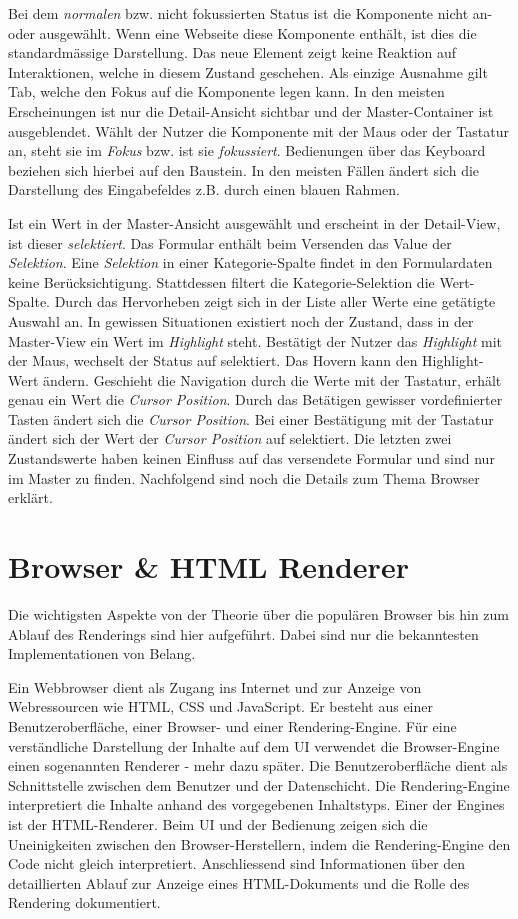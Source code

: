 Bei dem \emph{normalen} bzw. nicht fokussierten Status ist die Komponente nicht an- oder ausgewählt.
Wenn eine Webseite diese Komponente enthält, ist dies die standardmässige Darstellung.
Das neue Element zeigt keine Reaktion auf Interaktionen, welche in diesem Zustand geschehen. 
Als einzige Ausnahme gilt Tab, welche den Fokus auf die Komponente legen kann. 
In den meisten Erscheinungen ist nur die Detail-Ansicht sichtbar und der Master-Container ist ausgeblendet.
Wählt der Nutzer die Komponente mit der Maus oder der Tastatur an, steht sie im \emph{Fokus} bzw. ist sie \emph{fokussiert}.
Bedienungen über das Keyboard beziehen sich hierbei auf den Baustein.
In den meisten Fällen ändert sich die Darstellung des Eingabefeldes z.B. durch einen blauen Rahmen.

Ist ein Wert in der Master-Ansicht ausgewählt und erscheint in der Detail-View, ist dieser \emph{selektiert}.
Das Formular enthält beim Versenden das Value der \emph{Selektion}.
Eine \emph{Selektion} in einer Kategorie-Spalte findet in den Formulardaten keine Berücksichtigung.
Stattdessen filtert die Kategorie-Selektion die Wert-Spalte.
Durch das Hervorheben zeigt sich in der Liste aller Werte eine getätigte Auswahl an.
In gewissen Situationen existiert noch der Zustand, dass in der Master-View ein Wert im \emph{Highlight} steht. 
Bestätigt der Nutzer das \emph{Highlight} mit der Maus, wechselt der Status auf selektiert.
Das Hovern kann den Highlight-Wert ändern. 
Geschieht die Navigation durch die Werte mit der Tastatur, erhält genau ein Wert die \emph{Cursor Position}. 
Durch das Betätigen gewisser vordefinierter Tasten ändert sich die \emph{Cursor Position}.
Bei einer Bestätigung mit der Tastatur ändert sich der Wert der \emph{Cursor Position} auf selektiert.
Die letzten zwei Zustandswerte haben keinen Einfluss auf das versendete Formular und sind nur im Master zu finden.
Nachfolgend sind noch die Details zum Thema Browser erklärt.


\section{Browser \& HTML Renderer}
\label{sec:browserRenderer}

Die wichtigsten Aspekte von der Theorie über die populären Browser bis hin zum Ablauf des Renderings sind hier aufgeführt.
Dabei sind nur die bekanntesten Implementationen von Belang.

Ein Webbrowser dient als Zugang ins Internet und zur Anzeige von Webressourcen wie HTML, CSS und JavaScript.
Er besteht aus einer Benutzeroberfläche, einer Browser- und einer Rendering-Engine.
Für eine verständliche Darstellung der Inhalte auf dem UI verwendet die Browser-Engine einen sogenannten Renderer - mehr dazu später.
Die Benutzeroberfläche dient als Schnittstelle zwischen dem Benutzer und der Datenschicht. 
Die Rendering-Engine interpretiert die Inhalte anhand des vorgegebenen Inhaltstyps. 
Einer der Engines ist der HTML-Renderer.
Beim UI und der Bedienung zeigen sich die Uneinigkeiten zwischen den Browser-Herstellern, indem die Rendering-Engine den Code nicht gleich interpretiert.
Anschliessend sind Informationen über den detaillierten Ablauf zur Anzeige eines HTML-Dokuments und die Rolle des Rendering dokumentiert.



